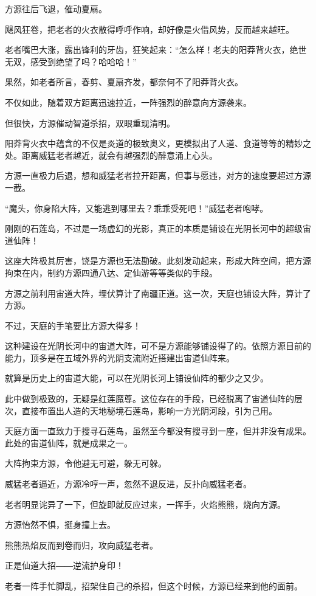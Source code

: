 \begin{this_body}
方源往后飞退，催动夏扇。

飓风狂卷，把老者的火衣散得呼呼作响，却好像是火借风势，反而越来越旺。

老者嘴巴大涨，露出锋利的牙齿，狂笑起来：“怎么样！老夫的阳莽背火衣，绝世无双，感受到绝望了吗？哈哈哈！”

果然，如老者所言，春剪、夏扇齐发，都奈何不了阳莽背火衣。

不仅如此，随着双方距离迅速拉近，一阵强烈的醉意向方源袭来。

但很快，方源催动智道杀招，双眼重现清明。

阳莽背火衣中蕴含的不仅是炎道的极致奥义，更模拟出了人道、食道等等的精妙之处。距离威猛老者越近，就会有越强烈的醉意涌上心头。

方源一直极力后退，想和威猛老者拉开距离，但事与愿违，对方的速度要超过方源一截。

“魔头，你身陷大阵，又能逃到哪里去？乖乖受死吧！”威猛老者咆哮。

刚刚的石莲岛，不过是一场虚幻的光影，真正的本质是铺设在光阴长河中的超级宙道仙阵！

这座大阵极其厉害，饶是方源也无法勘破。此刻发动起来，形成大阵空间，把方源拘束在内，制约方源四通八达、定仙游等等类似的手段。

方源之前利用宙道大阵，埋伏算计了南疆正道。这一次，天庭也铺设大阵，算计了方源。

不过，天庭的手笔要比方源大得多！

这种建设在光阴长河中的宙道大阵，可不是方源能够铺设得了的。依照方源目前的能力，顶多是在五域外界的光阴支流附近搭建出宙道仙阵来。

就算是历史上的宙道大能，可以在光阴长河上铺设仙阵的都少之又少。

此中做到极致的，无疑是红莲魔尊。这位存在的手段，已经脱离了宙道仙阵的层次，直接布置出人造的天地秘境石莲岛，影响一方光阴河段，引为己用。

天庭方面一直致力于搜寻石莲岛，虽然至今都没有搜寻到一座，但并非没有成果。此处的宙道仙阵，就是成果之一。

大阵拘束方源，令他避无可避，躲无可躲。

威猛老者逼近，方源冷哼一声，忽然不退反进，反扑向威猛老者。

老者明显诧异了一下，但旋即就反应过来，一挥手，火焰熊熊，烧向方源。

方源怡然不惧，挺身撞上去。

熊熊热焰反而到卷而归，攻向威猛老者。

正是仙道大招――逆流护身印！

老者一阵手忙脚乱，招架住自己的杀招，但这个时候，方源已经来到他的面前。


\end{this_body}
